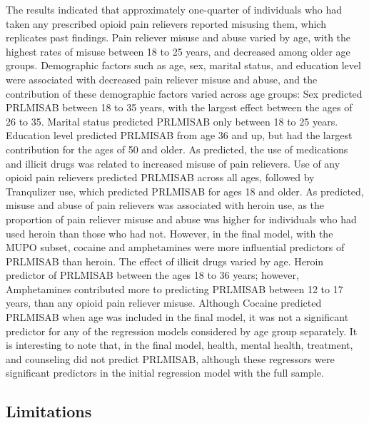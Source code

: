 \documentclass[sigconf]{acmart}
\begin{document}
The results indicated that approximately one-quarter of individuals who had 
taken any prescribed opioid pain relievers reported misusing them, which 
replicates past findings. Pain reliever misuse and abuse varied by age, with 
the highest rates of misuse between 18 to 25 years, and decreased among older 
age groups. Demographic factors such as age, sex, marital status, and education 
level were associated with decreased pain reliever misuse and abuse, and the 
contribution of these demographic factors varied across age groups: Sex 
predicted PRLMISAB between 18 to 35 years, with the largest effect between the 
ages of 26 to 35. Marital status predicted PRLMISAB only between 18 to 25 years. 
Education level predicted PRLMISAB from age 36 and up, but had the largest 
contribution for the ages of 50 and older. As predicted, the use of medications 
and illicit drugs was related to increased misuse of pain relievers. Use of any 
opioid pain relievers predicted PRLMISAB across all ages, followed by Tranqulizer 
use, which predicted PRLMISAB for ages 18 and older. As predicted, misuse and 
abuse of pain relievers was associated with heroin use, as the proportion of 
pain reliever misuse and abuse was higher for individuals who had used heroin 
than those who had not. However, in the final model, with the MUPO subset, 
cocaine and amphetamines were more influential predictors of PRLMISAB than heroin.
The effect of illicit drugs varied by age. Heroin predictor of PRLMISAB between 
the ages 18 to 36 years; however, Amphetamines contributed more to predicting 
PRLMISAB between 12 to 17 years, than any opioid pain reliever misuse. Although 
Cocaine predicted PRLMISAB when age was included in the final model, it was 
not a significant predictor for any of the regression models considered by age 
group separately. It is interesting to note that, in the final model, health, 
mental health, treatment, and counseling did not predict PRLMISAB, although 
these regressors were significant predictors in the initial regression 
model with the full sample. 

\subsection{Limitations}
\end{document}
